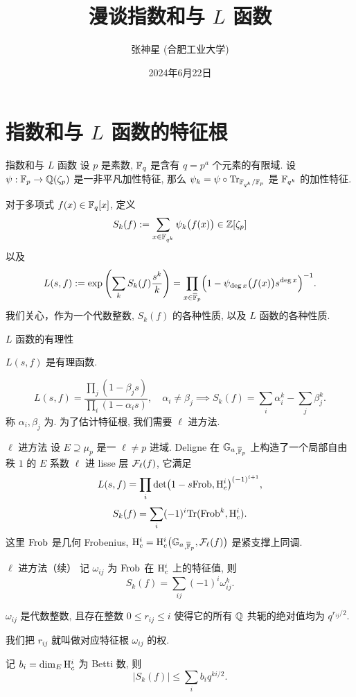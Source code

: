 \documentclass[aspectratio=169,handout]{ctexbeamer}
\title{漫谈指数和与 $L$ 函数}
\author{张神星 (合肥工业大学)}
\institute{首都师范大学}
\date{2024年6月22日}
\renewcommand\emph[1]{{\color{structure.fg!50!blue}{#1}}}
\begin{document}
\section{指数和与 $L$ 函数的特征根}
\begin{frame}{指数和与 $L$ 函数}
设 $p$ 是素数, ${\mathbb{F}}_q$ 是含有 $q=p^a$ 个元素的有限域.
设 $\psi:{\mathbb{F}}_p\to {\mathbb{Q}}(\zeta_p)$ 是一非平凡加性特征,
那么 $\psi_k=\psi\circ {\mathrm{Tr}}_{{\mathbb{F}}_{q^k}/{\mathbb{F}}_p}$ 是 ${\mathbb{F}}_{q^k}$ 的加性特征.

对于多项式 $f(x)\in {\mathbb{F}}_q[x]$, 定义\emph{指数和}
\[S_k(f):=\sum_{x\in{\mathbb{F}}_{q^k}}\psi_k\bigl(f(x)\bigr)\in{\mathbb{Z}}[\zeta_p]\]
以及\emph{$L$ 函数}
\[L(s,f):=\exp\left(\sum_k S_k(f)\frac{s^k}{k}\right)=\prod_{x\in\overline{{\mathbb{F}}}_p}\Bigl(1-\psi_{\deg x}\bigl(f(x)\bigr)s^{\deg x}\Bigr)^{-1}.\]
我们关心，作为一个代数整数, $S_k(f)$ 的各种性质, 以及 $L$ 函数的各种性质.
\end{frame}


\begin{frame}{$L$ 函数的有理性}
\begin{theorem}
$L(s,f)$ 是有理函数.
\end{theorem} 
	\[L(s,f)=\frac{\prod_j (1-\beta_j s)}{\prod_i(1-\alpha_i s)},\quad \alpha_i\neq \beta_j
	\implies
	S_k(f)=\sum_i \alpha_i^k-\sum_j\beta_j^k.\]
称 $\alpha_i,\beta_j$ 为\emph{特征根}. 为了估计特征根, 我们需要 $\ell$ 进方法.

\end{frame}


\begin{frame}{$\ell$ 进方法}
设 $E\supseteq \mu_p$ 是一 $\ell\neq p$ 进域.
Deligne 在 ${\mathbb{G}_a}_{,\overline{{\mathbb{F}}}_p}$ 上构造了一个局部自由秩 $1$ 的 $E$ 系数 $\ell$ 进 lisse 层 ${\mathcal{F}}_\ell(f)$, 它满足
	\[L(s,f)=\prod_i \det\bigl(1-s {\mathrm{Frob}},{\mathrm{H}}^i_c\bigr)^{(-1)^{i+1}},\]
	\[S_k(f)=\sum_i (-1)^i{\mathrm{Tr}}({\mathrm{Frob}}^k,{\mathrm{H}}_c^i).\]
这里 ${\mathrm{Frob}}$ 是几何 Frobenius, ${\mathrm{H}}_c^i={\mathrm{H}}_c^i\bigl({\mathbb{G}_a}_{,\overline{{\mathbb{F}}}_p},{\mathcal{F}}_\ell(f)\bigr)$ 是紧支撑上同调.
\end{frame}


\begin{frame}{$\ell$ 进方法（续）}
记 $\omega_{ij}$ 为 ${\mathrm{Frob}}$ 在 ${\mathrm{H}}^i_c$ 上的特征值, 则
	\[S_k(f)=\sum_{ij}(-1)^i \omega_{ij}^k.\]

\begin{theorem}[Deligne]
$\omega_{ij}$ 是代数整数, 且存在整数 $0\le r_{ij}\le i$ 使得它的所有 ${\mathbb{Q}}$ 共轭的绝对值均为 $q^{r_{ij}/2}$.
\end{theorem}
我们把 $r_{ij}$ 就叫做对应特征根 $\omega_{ij}$ 的权.

记 $b_i=\dim_{E}{\mathrm{H}}^i_c$ 为 Betti 数, 
则
	\[|S_k(f)|\le \sum_i b_i q^{ki/2}.\]
\end{frame}
\end{document}

